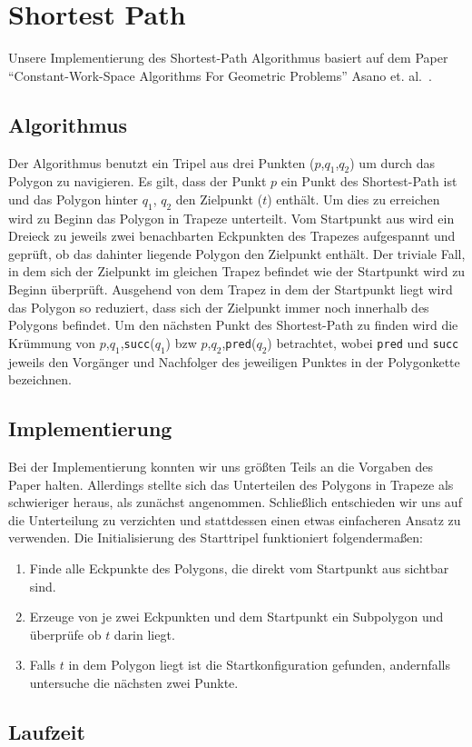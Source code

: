 \section{Shortest Path}
	
  Unsere Implementierung des Shortest-Path Algorithmus basiert auf dem Paper
  \enquote{Constant-Work-Space Algorithms For Geometric Problems} Asano et.
  al.~\cite{asano11shortestpath}.

  \subsection{Algorithmus}

    Der Algorithmus benutzt ein Tripel aus drei Punkten ($p$,$q_1$,$q_2$) um
    durch das Polygon zu navigieren. Es gilt, dass der Punkt $p$ ein Punkt des
    Shortest-Path ist und das Polygon hinter $q_1$, $q_2$ den Zielpunkt ($t$)
    enthält. Um dies zu erreichen wird zu Beginn das Polygon in Trapeze
    unterteilt. Vom Startpunkt aus wird ein Dreieck zu jeweils zwei
    benachbarten Eckpunkten des Trapezes aufgespannt und geprüft, ob das
    dahinter liegende Polygon den Zielpunkt enthält. Der triviale Fall, in dem
    sich der Zielpunkt im gleichen Trapez befindet wie der Startpunkt wird zu
    Beginn überprüft. Ausgehend von dem Trapez in dem der Startpunkt liegt
    wird das Polygon so reduziert, dass sich der Zielpunkt immer noch
    innerhalb des Polygons befindet. Um den nächsten Punkt des Shortest-Path
    zu finden wird die Krümmung von $p$,$q_1$,\texttt{succ}($q_1$) bzw
    $p$,$q_2$,\texttt{pred}($q_2$) betrachtet, wobei \texttt{pred} und
    \texttt{succ} jeweils den Vorgänger und Nachfolger des jeweiligen Punktes
    in der Polygonkette bezeichnen.

  \subsection{Implementierung}

    Bei der Implementierung konnten wir uns größten Teils an die Vorgaben des
    Paper halten. Allerdings stellte sich das Unterteilen des Polygons in
    Trapeze als schwieriger heraus, als zunächst angenommen. Schließlich
    entschieden wir uns auf die Unterteilung zu verzichten und stattdessen
    einen etwas einfacheren Ansatz zu verwenden. Die Initialisierung des
    Starttripel funktioniert folgendermaßen:

    \begin{enumerate}
      \item Finde alle Eckpunkte des Polygons, die direkt vom Startpunkt aus 
            sichtbar sind.
      \item Erzeuge von je zwei Eckpunkten und dem Startpunkt ein Subpolygon 
            und überprüfe ob $t$ darin liegt.
      \item Falls $t$ in dem Polygon liegt ist die Startkonfiguration gefunden, 
            andernfalls untersuche die nächsten zwei Punkte.
    \end{enumerate}

  \subsection{Laufzeit}